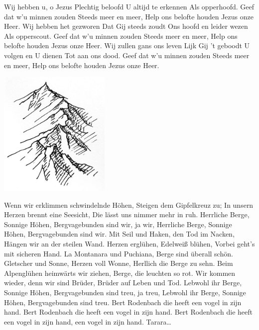 \documentclass{article}
\begin{document}
\begin{songs}{}
\endverse
\endsong
{}
\beginverse
Wij hebben u, o Jezus
Plechtig beloofd
U altijd te erkennen
Als opperhoofd.
\endverse
\beginchorus
Geef dat w'u minnen zouden
Steeds meer en meer,
Help ons belofte houden
Jezus onze Heer.
\endchorus
\beginverse
Wij hebben het gezworen
Dat Gij steeds zoudt
Ons hoofd en leider wezen
Als opperscout.
\endverse
\beginverse
Geef dat w'u minnen zouden
Steeds meer en meer,
Help ons belofte houden
Jezus onze Heer.
\endverse
\beginverse
Wij zullen gans ons leven
Lijk Gij 't geboodt
U volgen en U dienen
Tot aan ons dood.
\endverse
\beginverse
Geef dat w'u minnen zouden
Steeds meer en meer,
Help ons belofte houden
Jezus onze Heer.
\endverse
\endsong
\begin{intersong}
    \includegraphics[width=0.4\textwidth]{bergvagebunden}
\end{intersong}
\beginverse
Wenn wir erklimmen schwindelnde Höhen,
Steigen dem Gipfelkreuz zu;
In unsern Herzen brennt eine Seesicht,
Die lässt uns nimmer mehr in ruh. 
\endverse
\beginchorus
Herrliche Berge, Sonnige Höhen,
Bergvagebunden sind wir, ja wir,
Herrliche Berge, Sonnige Höhen,
Bergvagebunden sind wir.
\endchorus
\beginverse
Mit Seil und Haken, den Tod im Nacken,
Hängen wir an der steilen Wand. 
Herzen erglühen, Edelweiß blühen,
Vorbei geht’s mit sicheren Hand.
\endverse
\beginverse
La Montanara und Puchiana,
Berge sind überall schön.
Gletscher und Sonne, Herzen voll Wonne,
Herllich die Berge zu sehn.
\endverse
\beginverse
Beim Alpenglühen heimwärts wir ziehen,
Berge, die leuchten so rot. 
Wir kommen wieder, denn wir sind Brüder,
Brüder auf Leben und Tod.
\endverse
\beginchorus
Lebwohl ihr Berge,
Sonnige Höhen,
Bergvagebunden sind treu, ja treu,
Lebwohl ihr Berge, Sonnige Höhen,
Bergvagebunden sind treu. 
\endchorus
\endsong
{}
\beginverse*
Bert Rodenbach die heeft een vogel in zijn hand. 
Bert Rodenbach die heeft een vogel in zijn hand.
Bert Rodenbach die heeft een vogel in zijn hand, een vogel in zijn hand. Tarara…

\end{songs}
\end{document}
